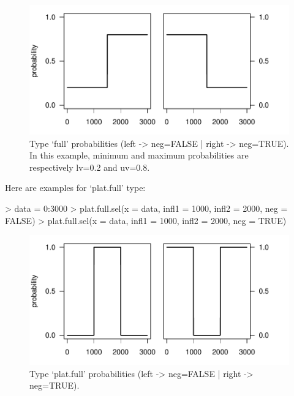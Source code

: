 \documentclass[letterpaper, 12pt]{article}
\begin{document}
\begin{figure}[h]
\vspace{-20pt}
\begin{center}
\includegraphics{relation_sel-007}
\end{center}
\vspace{-30pt}
\caption{Type `full' probabilities (left -> neg=FALSE |  right -> neg=TRUE). In this example, minimum and maximum probabilities are respectively lv=0.2 and uv=0.8.}
\vspace{-10pt}
\label{fig3}
\end{figure}

\newpage
Here are examples for `plat.full' type:
\begin{Schunk}
\begin{Sinput}
> data = 0:3000
> plat.full.sel(x = data, infl1 = 1000, infl2 = 2000, neg = FALSE)
> plat.full.sel(x = data, infl1 = 1000, infl2 = 2000, neg = TRUE)
\end{Sinput}
\end{Schunk}
\begin{figure}[h]
\vspace{-20pt}
\begin{center}
\includegraphics{relation_sel-009}
\end{center}
\vspace{-30pt}
\caption{Type `plat.full' probabilities (left -> neg=FALSE |  right -> neg=TRUE).}
\vspace{-10pt}
\label{fig4}
\end{figure}
\end{document}
